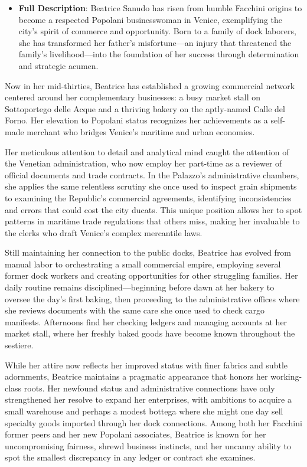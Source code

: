 \documentclass[11pt,a4paper]{article}
\begin{document}
\begin{itemize}
\item \textbf{Full Description}: Beatrice Sanudo has risen from humble Facchini origins to become a respected Popolani businesswoman in Venice, exemplifying the city's spirit of commerce and opportunity. Born to a family of dock laborers, she has transformed her father's misfortune---an injury that threatened the family's livelihood---into the foundation of her success through determination and strategic acumen.
\end{itemize}

Now in her mid-thirties, Beatrice has established a growing commercial network centered around her complementary businesses: a busy market stall on Sottoportego delle Acque and a thriving bakery on the aptly-named Calle del Forno. Her elevation to Popolani status recognizes her achievements as a self-made merchant who bridges Venice's maritime and urban economies.

Her meticulous attention to detail and analytical mind caught the attention of the Venetian administration, who now employ her part-time as a reviewer of official documents and trade contracts. In the Palazzo's administrative chambers, she applies the same relentless scrutiny she once used to inspect grain shipments to examining the Republic's commercial agreements, identifying inconsistencies and errors that could cost the city ducats. This unique position allows her to spot patterns in maritime trade regulations that others miss, making her invaluable to the clerks who draft Venice's complex mercantile laws.

Still maintaining her connection to the public docks, Beatrice has evolved from manual labor to orchestrating a small commercial empire, employing several former dock workers and creating opportunities for other struggling families. Her daily routine remains disciplined---beginning before dawn at her bakery to oversee the day's first baking, then proceeding to the administrative offices where she reviews documents with the same care she once used to check cargo manifests. Afternoons find her checking ledgers and managing accounts at her market stall, where her freshly baked goods have become known throughout the sestiere.

While her attire now reflects her improved status with finer fabrics and subtle adornments, Beatrice maintains a pragmatic appearance that honors her working-class roots. Her newfound status and administrative connections have only strengthened her resolve to expand her enterprises, with ambitions to acquire a small warehouse and perhaps a modest bottega where she might one day sell specialty goods imported through her dock connections. Among both her Facchini former peers and her new Popolani associates, Beatrice is known for her uncompromising fairness, shrewd business instincts, and her uncanny ability to spot the smallest discrepancy in any ledger or contract she examines.
\end{document}
